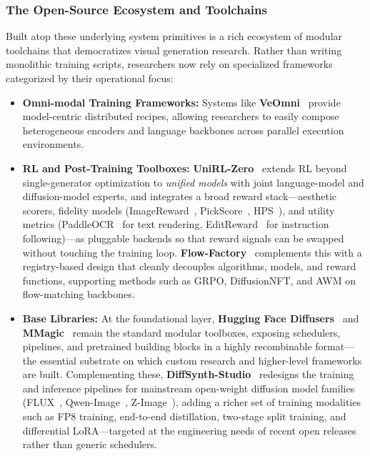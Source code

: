\documentclass{llmxive}
\begin{document}
\subsubsection{The Open-Source Ecosystem and Toolchains}
\label{subsubsec:infra_ecosystem}
Built atop these underlying system primitives is a rich ecosystem of modular toolchains that democratizes visual generation research. Rather than writing monolithic training scripts, researchers now rely on specialized frameworks categorized by their operational focus:
\begin{itemize}
    \item \textbf{Omni-modal Training Frameworks:} Systems like \textbf{VeOmni}~\citep{ma2025veomni} provide model-centric distributed recipes, allowing researchers to easily compose heterogeneous encoders and language backbones across parallel execution environments.
    \item \textbf{RL and Post-Training Toolboxes:} \textbf{UniRL-Zero}~\citep{wang2025unirl} extends RL beyond single-generator optimization to \emph{unified models} with joint language-model and diffusion-model experts, and integrates a broad reward stack---aesthetic scorers, fidelity models (ImageReward~\citep{xu2023imagereward}, PickScore~\citep{kirstain2023pick}, HPS~\citep{wu2023human,ma2025hpsv3widespectrumhumanpreference}), and utility metrics (PaddleOCR~\citep{cui2025paddleocr30technicalreport} for text rendering, EditReward~\citep{wu2025editreward} for instruction following)---as pluggable backends so that reward signals can be swapped without touching the training loop. \textbf{Flow-Factory}~\citep{ping2026flowfactory} complements this with a registry-based design that cleanly decouples algorithms, models, and reward functions, supporting methods such as GRPO, DiffusionNFT, and AWM on flow-matching backbones.
    \item \textbf{Base Libraries:} At the foundational layer, \textbf{Hugging Face Diffusers}~\citep{von-platen-etal-2022-diffusers} and \textbf{MMagic}~\citep{mmagic2023} remain the standard modular toolboxes, exposing schedulers, pipelines, and pretrained building blocks in a highly recombinable format---the essential substrate on which custom research and higher-level frameworks are built. Complementing these, \textbf{DiffSynth-Studio}~\citep{diffsynth-studio} redesigns the training and inference pipelines for mainstream open-weight diffusion model families (FLUX~\citep{labs2025flux1kontextflowmatching}, Qwen-Image~\citep{wu2025qwen}, Z-Image~\citep{cai2025z}), adding a richer set of training modalities such as FP8 training, end-to-end distillation, two-stage split training, and differential LoRA---targeted at the engineering needs of recent open releases rather than generic schedulers.
\end{itemize}
\end{document}
